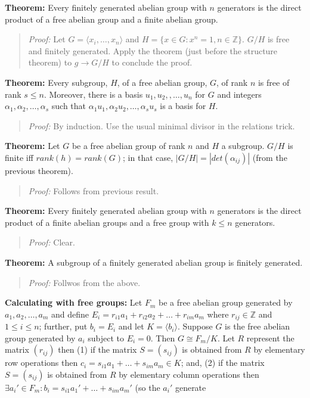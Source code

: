 {\bf Theorem:}
Every finitely generated abelian group with $n$ generators is the direct product of a
free abelian group and a finite abelian group.
\begin{quote}
\emph{Proof:}  
Let $G= \langle x_i , \ldots ,x_n \rangle$ and $H= \{ x \in G: x^n=1, n \in {\mathbb Z} \}$.
$G/H$ is free and finitely generated.  Apply the theorem (just before the structure theorem)
to $g \rightarrow G/H$ to conclude the proof.
\end{quote}
{\bf Theorem:} Every subgroup, $H$, of a free abelian group, $G$, of rank $n$ is free of
rank $s \leq n$.
Moreover, there is a basis $u_1 , u_2 , , \ldots , u_n$ for $G$ and integers
$\alpha_1 , \alpha_2 , \ldots , \alpha_s$  such that
$\alpha_1 u_1 , \alpha_2 u_2 , \ldots , \alpha_s u_s$  is a basis for $H$.
\begin{quote}
\emph{Proof:}  By induction.  Use the usual minimal divisor in the relations trick.
\end{quote}
{\bf Theorem:}  Let $G$ be a free abelian group of rank $n$ and $H$ a subgroup.  $G/H$ is
finite iff $rank(h)=rank(G)$; in that case, $|G/H| = |det(\alpha_{ij})|$ (from the previous theorem).
\begin{quote}
\emph{Proof:} Follows from previous result.
\end{quote}
{\bf Theorem:} Every finitely generated abelian group with $n$ generators is the direct product of
a finite abelian groups and a free group with $k \leq n$ generators.
\begin{quote}
\emph{Proof:}   Clear.
\end{quote}
{\bf Theorem:}  A subgroup of a finitely generated abelian group is finitely generated.
\begin{quote}
\emph{Proof:} Follwos from the above.
\end{quote}
{\bf Calculating with free groups:}
Let $F_m$ be a free abelian group generated by $a_1 , a_2 , \ldots , a_m$ and
define $E_i= r_{i1} a_1 + r_{i2} a_2 + \ldots + r_{im} a_m$ where
$r_{ij} \in {\mathbb Z}$ and $1 \le i \le n$; further, put
$b_i= E_i$ and let $K= \langle b_i \rangle$.  
Suppose $G$ is the free abelian group generated
by $a_i$ subject to $E_i = 0$.  Then $G \cong F_m / K$.  Let $R$ represent the matrix
$(r_{ij})$ then 
(1) if the matrix $S=(s_{ij})$ is obtained from $R$ by elementary row operations then
$c_i= s_{i1} a_1 + \ldots + s_{im} a_m \in K$; and,
(2) if the matrix $S=(s_{ij})$ is obtained from $R$ by elementary column operations then
$\exists a_i' \in F_m: b_i= s_{i1} a_1' + \ldots + s_{im} a_m'$ (so the $a_i'$ generate
